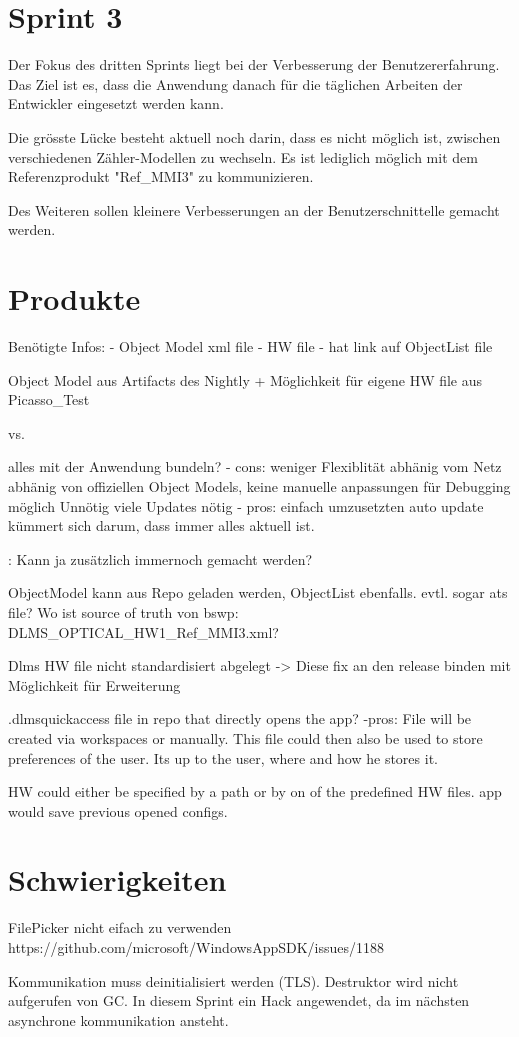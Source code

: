 \section{Sprint 3}
Der Fokus des dritten Sprints liegt bei der Verbesserung der Benutzererfahrung.
Das Ziel ist es, dass die Anwendung danach für die täglichen Arbeiten der Entwickler eingesetzt werden kann.

Die grösste Lücke besteht aktuell noch darin, dass es nicht möglich ist, zwischen verschiedenen Zähler-Modellen zu wechseln.
Es ist lediglich möglich mit dem Referenzprodukt "Ref_MMI3" zu kommunizieren.

Des Weiteren sollen kleinere Verbesserungen an der Benutzerschnittelle gemacht werden.


\section{Produkte}
Benötigte Infos:
- Object Model xml file
- HW file
   - hat link auf ObjectList file

Object Model aus Artifacts des Nightly
+ Möglichkeit für eigene
HW file aus Picasso_Test

vs.

alles mit der Anwendung bundeln?
- cons:
weniger Flexiblität
abhänig vom Netz
abhänig von offiziellen Object Models, keine manuelle anpassungen für Debugging möglich
Unnötig viele Updates nötig
- pros:
einfach umzusetzten
auto update kümmert sich darum, dass immer alles aktuell ist.

: Kann ja zusätzlich immernoch gemacht werden?


ObjectModel kann aus Repo geladen werden, ObjectList ebenfalls.
evtl. sogar ats file?
Wo ist source of truth von bswp: DLMS_OPTICAL_HW1_Ref_MMI3.xml?


Dlms HW file nicht standardisiert abgelegt
-> Diese fix an den release binden mit Möglichkeit für Erweiterung

.dlmsquickaccess file in repo that directly opens the app?
-pros:
File will be created via workspaces or manually.
This file could then also be used to store preferences of the user. Its up to the user, where and how he stores it.

HW could either be specified by a path or by on of the predefined HW files.
app would save previous opened configs.



\section{Schwierigkeiten}
FilePicker nicht eifach zu verwenden
https://github.com/microsoft/WindowsAppSDK/issues/1188

Kommunikation muss deinitialisiert werden (TLS). Destruktor wird nicht aufgerufen von GC. 
In diesem Sprint ein Hack angewendet, da im nächsten asynchrone kommunikation ansteht.